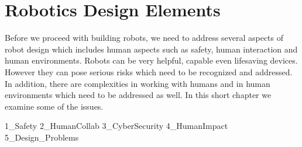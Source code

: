 \hypertarget{Chap:Design}{%
\section{Robotics Design Elements}\label{Chap:Design}}

Before we proceed with building robots, we need to address several
aspects of robot design which includes human aspects such as safety,
human interaction and human environments. Robots can be very helpful,
capable even lifesaving devices. However they can pose serious risks
which need to be recognized and addressed. In addition, there are
complexities in working with humans and in human environments which need
to be addressed as well. In this short chapter we examine some of the
issues.

1\_Safety 2\_HumanCollab 3\_CyberSecurity 4\_HumanImpact
5\_Design\_Problems

